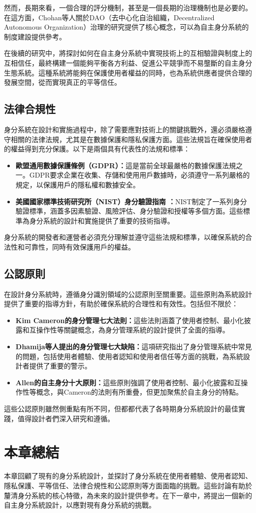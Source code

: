 然而，長期來看，一個合理的評分機制，甚至是一個長期的治理機制也是必要的。在這方面，Chohan等人\cite{chohan2024decentralized}關於DAO（去中心化自治組織，Decentralized Autonomous Organization）治理的研究提供了核心概念，可以為自主身分系統的制度建設提供參考。

在後續的研究中，將探討如何在自主身分系統中實現技術上的互相驗證與制度上的互相信任，最終構建一個能夠平衡各方利益、促進公平競爭而不易壟斷的自主身分生態系統。這種系統將能夠在保護使用者權益的同時，也為系統供應者提供合理的發展空間，從而實現真正的平等信任。
\subsection{法律合規性}
身分系統在設計和實施過程中，除了需要應對技術上的關鍵挑戰外，還必須嚴格遵守相關的法律法規，尤其是在數據保護和隱私保護方面。這些法規旨在確保使用者的權益得到充分保護。以下是兩個具有代表性的法規和標準：
\begin{itemize}
  \item \textbf{歐盟通用數據保護條例（GDPR）\cite{GDPR2016}：}這是當前全球最嚴格的數據保護法規之一。GDPR要求企業在收集、存儲和使用用戶數據時，必須遵守一系列嚴格的規定，以保護用戶的隱私權和數據安全。
  \item \textbf{美國國家標準技術研究所（NIST）身分驗證指南 \cite{NIST800-63-3}：}NIST制定了一系列身分驗證標準，涵蓋多因素驗證、風險評估、身分驗證和授權等多個方面。這些標準為身分系統的設計和實施提供了重要的技術指導。
\end{itemize}
身分系統的開發者和運營者必須充分理解並遵守這些法規和標準，以確保系統的合法性和可靠性，同時有效保護用戶的權益。
\subsection{公認原則}
在設計身分系統時，遵循身分識別領域的公認原則至關重要。這些原則為系統設計提供了重要的指導方針，有助於確保系統的合理性和有效性。包括但不限於：
\begin{itemize}
  \item \textbf{Kim Cameron的身分管理七大法則\cite{cameron2005laws}：}這些法則涵蓋了使用者控制、最小化披露和互操作性等關鍵概念，為身分管理系統的設計提供了全面的指導。
  \item \textbf{Dhamija等人提出的身分管理七大缺陷\cite{dhamija2008sevenflaws}：}這項研究指出了身分管理系統中常見的問題，包括使用者體驗、使用者認知和使用者信任等方面的挑戰，為系統設計者提供了重要的警示。
  \item \textbf{Allen的自主身分十大原則\cite{allen2016selfsovereign}：}這些原則強調了使用者控制、最小化披露和互操作性等概念，與Cameron的法則有所重疊，但更加聚焦於自主身分的特點。
\end{itemize}
這些公認原則雖然側重點有所不同，但都都代表了各時期身分系統設計的最佳實踐，值得設計者們深入研究和遵循。
\section{本章總結}
本章回顧了現有的身分系統設計，並探討了身分系統在使用者體驗、使用者認知、隱私保護、平等信任、法律合規性和公認原則等方面面臨的挑戰。這些討論有助於釐清身分系統的核心特徵，為未來的設計提供參考。在下一章中，將提出一個新的自主身分系統設計，以應對現有身分系統的挑戰。
